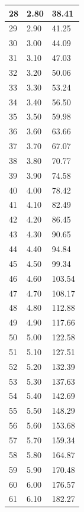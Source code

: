 \documentclass{article}
\begin{document}
\begin{longtable}{|l|l|l|}
        28 & 2.80 & 38.41 \\ \hline
        29 & 2.90 & 41.25 \\ \hline
        30 & 3.00 & 44.09 \\ \hline
        31 & 3.10 & 47.03 \\ \hline
        32 & 3.20 & 50.06 \\ \hline
        33 & 3.30 & 53.24 \\ \hline
        34 & 3.40 & 56.50 \\ \hline
        35 & 3.50 & 59.98 \\ \hline
        36 & 3.60 & 63.66 \\ \hline
        37 & 3.70 & 67.07 \\ \hline
        38 & 3.80 & 70.77 \\ \hline
        39 & 3.90 & 74.58 \\ \hline
        40 & 4.00 & 78.42 \\ \hline
        41 & 4.10 & 82.49 \\ \hline
        42 & 4.20 & 86.45 \\ \hline
        43 & 4.30 & 90.65 \\ \hline
        44 & 4.40 & 94.84 \\ \hline
        45 & 4.50 & 99.34 \\ \hline
        46 & 4.60 & 103.54 \\ \hline
        47 & 4.70 & 108.17 \\ \hline
        48 & 4.80 & 112.88 \\ \hline
        49 & 4.90 & 117.66 \\ \hline
        50 & 5.00 & 122.58 \\ \hline
        51 & 5.10 & 127.51 \\ \hline
        52 & 5.20 & 132.39 \\ \hline
        53 & 5.30 & 137.63 \\ \hline
        54 & 5.40 & 142.69 \\ \hline
        55 & 5.50 & 148.29 \\ \hline
        56 & 5.60 & 153.68 \\ \hline
        57 & 5.70 & 159.34 \\ \hline
        58 & 5.80 & 164.87 \\ \hline
        59 & 5.90 & 170.48 \\ \hline
        60 & 6.00 & 176.57 \\ \hline
        61 & 6.10 & 182.27 \\ \hline

\end{longtable}
\end{document}

